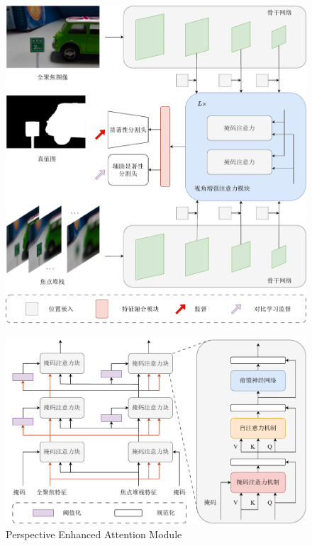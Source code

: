 %
%
\begin{figure}[!ht]
	\centering
	\includegraphics[width=0.95\linewidth]{figures/chapter4/chpt4_overview}
	\label{cpt4_fig1:chpt4_overview}
\end{figure}
%
%

\begin{figure}[!ht]
	\centering
	\includegraphics[width=0.95\linewidth]{figures/chapter4/view_enhance}
	{Perspective Enhanced Attention Module}  
	\label{cpt4_fig1:view_enhance}
\end{figure}
%
%

